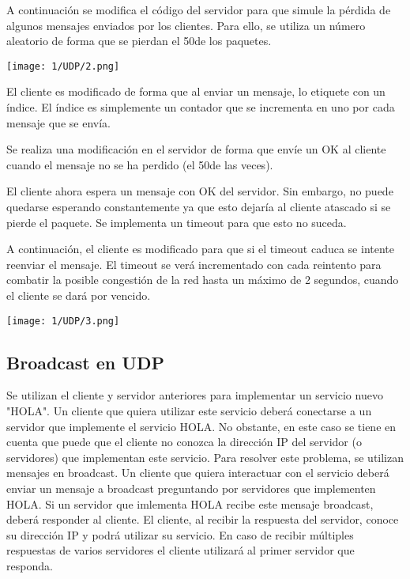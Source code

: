 A continuación se modifica el código del servidor para que
simule la pérdida de algunos mensajes enviados por los clientes.
Para ello, se utiliza un número aleatorio de forma que se pierdan
el 50\percentsign de los paquetes.

\begin{minipage}{\linewidth}
	\centering
	\texttt{[image: 1/UDP/2.png]}
	\label{fig:1/2}
\end{minipage}

El cliente es modificado de forma que al enviar un mensaje,
lo etiquete con un índice.
El índice es simplemente un contador que se incrementa en uno
por cada mensaje que se envía.

Se realiza una modificación en el servidor de forma que envíe
un OK al cliente cuando el mensaje no se ha perdido
(el 50\percentsign de las veces).

El cliente ahora espera un mensaje con OK del servidor.
Sin embargo, no puede quedarse esperando constantemente ya que esto
dejaría al cliente atascado si se pierde el paquete.
Se implementa un timeout para que esto no suceda.

A continuación, el cliente es modificado para que si el timeout caduca
se intente reenviar el mensaje.
El timeout se verá incrementado con cada reintento para combatir la posible
congestión de la red hasta un máximo de 2 segundos, cuando el cliente
se dará por vencido.

\begin{minipage}{\linewidth}
	\centering
	\texttt{[image: 1/UDP/3.png]}
	\label{fig:1/3}
\end{minipage}

\subsection{Broadcast en UDP}

Se utilizan el cliente y servidor anteriores para implementar un servicio nuevo "HOLA".
Un cliente que quiera utilizar este servicio deberá conectarse a un servidor que implemente
el servicio HOLA.
No obstante, en este caso se tiene en cuenta que puede que el cliente no conozca la dirección
IP del servidor (o servidores) que implementan este servicio.
Para resolver este problema, se utilizan mensajes en broadcast.
Un cliente que quiera interactuar con el servicio deberá enviar un mensaje a broadcast
preguntando por servidores que implementen HOLA.
Si un servidor que imlementa HOLA recibe este mensaje broadcast, deberá responder al cliente.
El cliente, al recibir la respuesta del servidor, conoce su dirección IP y podrá utilizar su servicio.
En caso de recibir múltiples respuestas de varios servidores
el cliente utilizará al primer servidor que responda.

